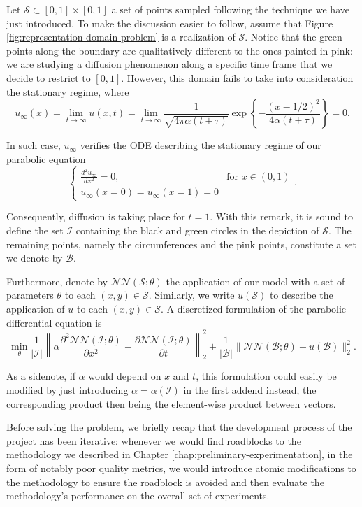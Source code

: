 \documentclass[12pt]{report} %
\begin{document}
Let $\mathcal{S} \subset [0, 1] \times [0, 1]$ a set of points sampled
following the technique we have just introduced. To make the discussion easier
to follow, assume that Figure \ref{fig:representation-domain-problem} is a
realization of $\mathcal{S}$. Notice that the green points along the boundary
are qualitatively different to the ones painted in pink: we are studying a
diffusion phenomenon along a specific time frame that we decide to restrict to
$[0, 1]$. However, this domain fails to take into consideration the stationary
regime, where
\[ u_{\infty} (x) = \lim_{t \rightarrow \infty} u (x, t) = \lim_{t \rightarrow
   \infty} \frac{1}{\sqrt{4 \pi \alpha (t + \tau)}} \exp \left\{ - \frac{(x -
   1 / 2)^2}{4 \alpha (t + \tau)} \right\} = 0. \]

In such case, $u_{\infty}$ verifies the ODE describing the stationary regime of our parabolic equation
\[ \left\{\begin{array}{ll}
     \frac{d^2 u_{\infty}}{d x^2} = 0, & \text{for } x \in (0, 1)\\
     u_{\infty} (x=0) = u_{\infty} (x=1) = 0 & 
   \end{array}\right. . \]

Consequently, diffusion is taking place for $t = 1$. With this remark, it is sound to define the set $\mathcal{I}$ containing the black and green circles in the
depiction of $\mathcal{S}$. The remaining points, namely the circumferences
and the pink points, constitute a set we denote by $\mathcal{B}$.

Furthermore, denote by $\mathcal{N}\mathcal{N} (\mathcal{S}; \theta)$ the application
of our model with a set of parameters $\theta$ to each $(x, y) \in
\mathcal{S}$. Similarly, we write $u (\mathcal{S})$ to describe the application of $u$
to each $(x, y) \in \mathcal{S}$. A discretized formulation of the parabolic
differential equation is
\[ \min_{\theta} \frac{1}{| \mathcal{I} |} \left\| \alpha \frac{\partial^2
   \mathcal{N}\mathcal{N} (\mathcal{I}; \theta)}{\partial x^2} -
   \frac{\partial \mathcal{N}\mathcal{N} (\mathcal{I}; \theta)}{\partial t}
   \right\|_2^2 + \frac{1}{| \mathcal{B} |} \| \mathcal{N}\mathcal{N}
   (\mathcal{B}; \theta) - u (\mathcal{B}) \|_2^2. \]

As a sidenote, if $\alpha$ would depend on $x$ and $t$, this formulation could easily be modified by just introducing $\alpha=\alpha(\mathcal{I})$ in the first addend instead, the corresponding product then being the element-wise product between vectors.

Before solving the problem, we briefly recap that the development process of the project has been iterative: whenever we would find roadblocks to the methodology we described in Chapter \ref{chap:preliminary-experimentation}, in the form of notably poor quality metrics, we would introduce atomic modifications to the methodology to ensure the roadblock is avoided and then evaluate the methodology's performance on the overall set of experiments.
\end{document}
